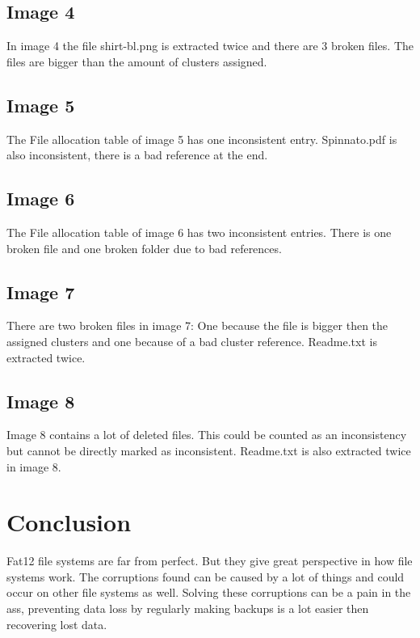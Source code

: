 \documentclass[pdftex,12pt,a4paper]{article}
\begin{document}
\subsection{Image 4}
In image 4 the file shirt-bl.png is extracted twice and there are 3 broken files. The files are bigger than the amount of clusters assigned. 
\subsection{Image 5}
The File allocation table of image 5 has one inconsistent entry.
Spinnato.pdf is also inconsistent, there is a bad reference at the end.
\subsection{Image 6}
The File allocation table of image 6 has two inconsistent entries. There is one broken file and one broken folder due to bad references.
\subsection{Image 7}
There are two broken files in image 7: One because the file is bigger then the assigned clusters and one because of a bad cluster reference. Readme.txt is extracted twice.
\subsection{Image 8}
Image 8 contains a lot of deleted files. This could be counted as an inconsistency but cannot be directly marked as inconsistent. Readme.txt is also extracted twice in image 8. 

\section{Conclusion}
Fat12 file systems are far from perfect. But they give great perspective in how file systems work. The corruptions found can be caused by a lot of things and could occur on other file systems as well. Solving these corruptions can be a pain in the ass, preventing data loss by regularly making backups is a lot easier then recovering lost data. 
\end{document}
